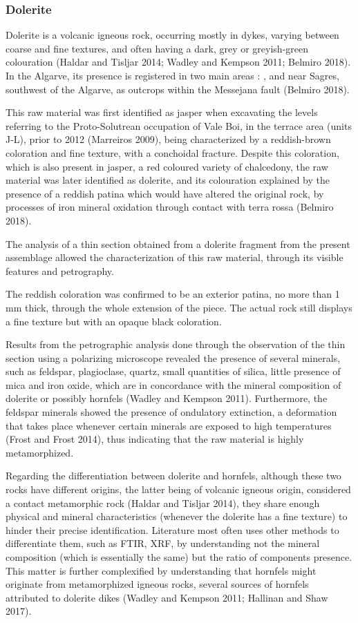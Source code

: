 \documentclass[12pt,twoside]{reedthesis}
\begin{document}
\hypertarget{dolerite}{%
\subsubsection{Dolerite}\label{dolerite}}

Dolerite is a volcanic igneous rock, occurring mostly in dykes, varying between coarse and fine textures, and often having a dark, grey or greyish-green colouration (Haldar and Tisljar 2014; Wadley and Kempson 2011; Belmiro 2018). In the Algarve, its presence is registered in two main areas : , and near Sagres, southwest of the Algarve, as outcrops within the Messejana fault (Belmiro 2018).

This raw material was first identified as jasper when excavating the levels referring to the Proto-Solutrean occupation of Vale Boi, in the terrace area (units J-L), prior to 2012 (Marreiros 2009), being characterized by a reddish-brown coloration and fine texture, with a conchoidal fracture. Despite this coloration, which is also present in jasper, a red coloured variety of chalcedony, the raw material was later identified as dolerite, and its colouration explained by the presence of a reddish patina which would have altered the original rock, by processes of iron mineral oxidation through contact with terra rossa (Belmiro 2018).

The analysis of a thin section obtained from a dolerite fragment from the present assemblage allowed the characterization of this raw material, through its visible features and petrography.

The reddish coloration was confirmed to be an exterior patina, no more than 1 mm thick, through the whole extension of the piece. The actual rock still displays a fine texture but with an opaque black coloration.

Results from the petrographic analysis done through the observation of the thin section using a polarizing microscope revealed the presence of several minerals, such as feldspar, plagioclase, quartz, small quantities of silica, little presence of mica and iron oxide, which are in concordance with the mineral composition of dolerite or possibly hornfels (Wadley and Kempson 2011). Furthermore, the feldspar minerals showed the presence of ondulatory extinction, a deformation that takes place whenever certain minerals are exposed to high temperatures (Frost and Frost 2014), thus indicating that the raw material is highly metamorphized.

Regarding the differentiation between dolerite and hornfels, although these two rocks have different origins, the latter being of volcanic igneous origin, considered a contact metamorphic rock (Haldar and Tisljar 2014), they share enough physical and mineral characteristics (whenever the dolerite has a fine texture) to hinder their precise identification. Literature most often uses other methods to differentiate them, such as FTIR, XRF, by understanding not the mineral composition (which is essentially the same) but the ratio of components presence. This matter is further complexified by understanding that hornfels might originate from metamorphized igneous rocks, several sources of hornfels attributed to dolerite dikes (Wadley and Kempson 2011; Hallinan and Shaw 2017).
\end{document}
